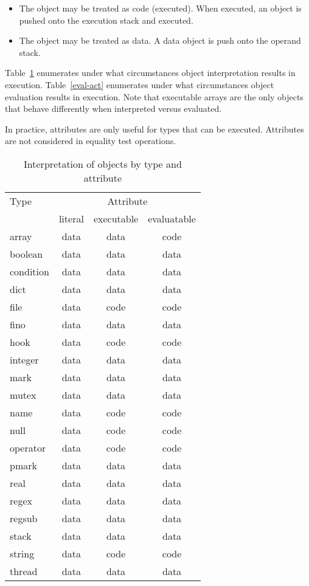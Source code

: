 \begin{itemize}
\item{The object may be treated as code (executed).  When executed, an object is
pushed onto the execution stack and executed.}
\item{The object may be treated as data.  A data object is push onto the operand
stack.}
\end{itemize}

Table~\ref{interp-act} enumerates under what circumstances object interpretation
results in execution.  Table~\ref{eval-act} enumerates under what circumstances
object evaluation results in execution.  Note that executable arrays are the
only objects that behave differently when interpreted versus evaluated.

In practice, attributes are only useful for types that can be executed.
Attributes are not considered in equality test operations.

\begin{table}[htb]
\begin{center}
\begin{tabular}{|l|c|c|c|}
\hline
Type		& \multicolumn{3}{|c|}{Attribute}	\\
\cline{2-4}
		& literal & executable & evaluatable	\\
\hline \hline
array		& data	& data	& code	\\
\hline
boolean		& data	& data	& data	\\
\hline
condition	& data	& data	& data	\\
\hline
dict		& data	& data	& data	\\
\hline
file		& data	& code	& code	\\
\hline
fino		& data	& data	& data	\\
\hline
hook		& data	& code	& code	\\
\hline
integer		& data	& data	& data	\\
\hline
mark		& data	& data	& data	\\
\hline
mutex		& data	& data	& data	\\
\hline
name		& data	& code	& code	\\
\hline
null		& data	& code	& code	\\
\hline
operator	& data	& code	& code	\\
\hline
pmark		& data	& data	& data	\\
\hline
real		& data	& data	& data	\\
\hline
regex		& data	& data	& data	\\
\hline
regsub		& data	& data	& data	\\
\hline
stack		& data	& data	& data	\\
\hline
string		& data	& code	& code	\\
\hline
thread		& data	& data	& data	\\
\hline
\end{tabular}
\end{center}
\caption{\label{interp-act}
Interpretation of objects by type and attribute}
\end{table}


